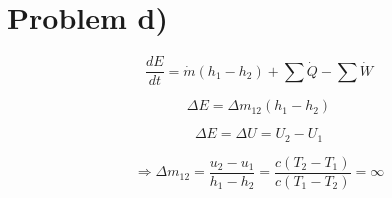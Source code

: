 \section*{Problem d)}

\begin{equation*}
\frac{dE}{dt} = \dot{m}(h_1 - h_2) + \sum \dot{Q} - \sum \dot{W}
\end{equation*}

\begin{equation*}
\Delta E = \Delta m_{12} (h_1 - h_2)
\end{equation*}

\begin{equation*}
\Delta E = \Delta U = U_2 - U_1
\end{equation*}

\begin{equation*}
\Rightarrow \Delta m_{12} = \frac{u_2 - u_1}{h_1 - h_2} = \frac{c(T_2 - T_1)}{c(T_1 - T_2)} = \infty
\end{equation*}